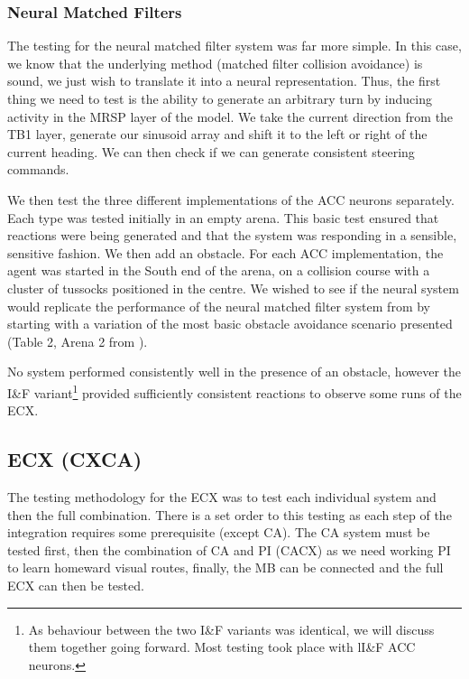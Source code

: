 \documentclass[a4paper,11pt,twoside,openright]{article}
\begin{document}
\subsubsection{Neural Matched Filters}
The testing for the neural matched filter system was far more
simple. In this case, we know that the underlying method (matched
filter collision avoidance) is sound, we just wish to translate it
into a neural representation. Thus, the first thing we need to test is
the ability to generate an arbitrary turn by inducing activity in the
MRSP layer of the model. We take the current direction from the TB1
layer, generate our sinusoid array and shift it to the left or right of the
current heading. We can then check if we can generate consistent
steering commands.
\newline
\par

We then test the three different implementations of the ACC neurons
separately. Each type was tested initially in an empty arena. This
basic test ensured that reactions were being generated and that the
system was responding in a sensible, sensitive fashion. We then add an
obstacle.  For each ACC implementation, the agent was started in the South
end of the arena, on a collision course with a cluster of tussocks
positioned in the centre. We wished to see if the neural system would
replicate the performance of the neural matched filter system from
\cite{Mitchell2018} by starting with a variation of the most basic
obstacle avoidance scenario presented (Table 2, Arena 2 from
\cite{Mitchell2018}).
\newline\par

No system performed consistently well in the presence of an obstacle,
however the I\&F variant\footnote{As behaviour between the two I\&F
  variants was identical, we will discuss them together going
  forward. Most testing took place with lI\&F ACC neurons.} provided
sufficiently consistent reactions to observe some runs of the
ECX.

\subsection{ECX (CXCA)}
The testing methodology for the ECX was to test each individual system
and then the full combination. There is a set order to this testing as
each step of the integration requires some prerequisite (except
CA). The CA system must be tested first, then the combination of CA
and PI (CACX) as we need working PI to learn homeward visual routes,
finally, the MB can be connected and the full ECX can then be tested.
\newline\par
\end{document}
